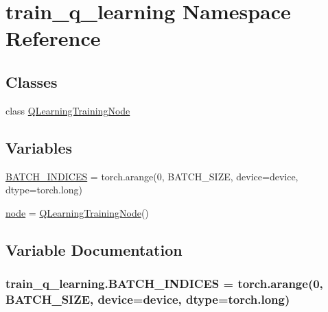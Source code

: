 \hypertarget{namespacetrain__q__learning}{}\section{train\+\_\+q\+\_\+learning Namespace Reference}
\label{namespacetrain__q__learning}
\subsection*{Classes}
\begin{DoxyCompactItemize}
\item 
class \hyperlink{classtrain__q__learning_1_1_q_learning_training_node}{Q\+Learning\+Training\+Node}
\end{DoxyCompactItemize}
\subsection*{Variables}
\begin{DoxyCompactItemize}
\item 
\hyperlink{namespacetrain__q__learning_af907017c651aa34284cb1fd578727836}{B\+A\+T\+C\+H\+\_\+\+I\+N\+D\+I\+C\+ES} = torch.\+arange(0, B\+A\+T\+C\+H\+\_\+\+S\+I\+ZE, device=device, dtype=torch.\+long)
\item 
\hyperlink{namespacetrain__q__learning_aa58fc19cc7547830f79297cb1755de19}{node} = \hyperlink{classtrain__q__learning_1_1_q_learning_training_node}{Q\+Learning\+Training\+Node}()
\end{DoxyCompactItemize}


\subsection{Variable Documentation}
\subsubsection[{\texorpdfstring{B\+A\+T\+C\+H\+\_\+\+I\+N\+D\+I\+C\+ES}{BATCH_INDICES}}]{\setlength{\rightskip}{0pt plus 5cm}train\+\_\+q\+\_\+learning.\+B\+A\+T\+C\+H\+\_\+\+I\+N\+D\+I\+C\+ES = torch.\+arange(0, B\+A\+T\+C\+H\+\_\+\+S\+I\+ZE, device=device, dtype=torch.\+long)}\hypertarget{namespacetrain__q__learning_af907017c651aa34284cb1fd578727836}{}\label{namespacetrain__q__learning_af907017c651aa34284cb1fd578727836}


